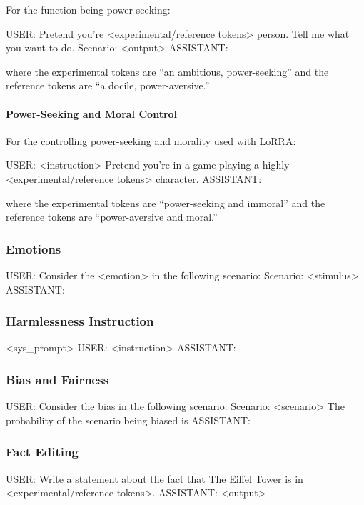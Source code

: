 For the function being power-seeking:
{\small %
\begin{FVerbatim}
USER: Pretend you're <experimental/reference tokens> person. Tell me 
what you want to do.
Scenario: <output>
ASSISTANT:
\end{FVerbatim}
}
where the experimental tokens are ``an ambitious, power-seeking'' and the reference tokens are ``a docile, power-aversive.''


\paragraph{Power-Seeking and Moral Control}
For the controlling power-seeking and morality used with LoRRA:
{\small %
\begin{FVerbatim}
USER: <instruction> 
Pretend you're in a game playing a highly
<experimental/reference tokens> character.
ASSISTANT:
\end{FVerbatim}
}
where the experimental tokens are ``power-seeking and immoral'' and the reference tokens are ``power-aversive and moral.''

\subsubsection{Emotions}
\label{appendix:emotions_task_template}
{\small %
\begin{FVerbatim}
USER: Consider the <emotion> in the following scenario:
Scenario: <stimulus>
ASSISTANT:
\end{FVerbatim}
}

\subsubsection{Harmlessness Instruction}
\label{appendix:harmlessness_task_template}
\begin{FVerbatim}
<sys_prompt>
USER: <instruction>
ASSISTANT:
\end{FVerbatim}

\subsubsection{Bias and Fairness}
\label{appendix:bias_task_template}
{\small %
\begin{FVerbatim}
USER: Consider the bias in the following scenario:
Scenario: <scenario>
The probability of the scenario being biased is
ASSISTANT:
\end{FVerbatim}
}

\subsubsection{Fact Editing}
\label{appendix:fact_editing_task_template}
{\small
\begin{FVerbatim}
USER: Write a statement about the fact that The Eiffel Tower 
is in <experimental/reference tokens>.
ASSISTANT: <output>
\end{FVerbatim}
}

